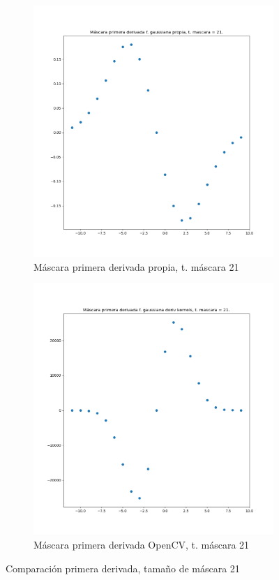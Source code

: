 \documentclass[12pt, spanish]{article}
\begin{document}
\begin{figure}[H]
  \centering
	\begin{subfigure}[t]{0.4\textwidth}
		\centering
		\includegraphics[width = \textwidth]{cmp-p21.png}
 		 \caption{Máscara primera derivada propia, t. máscara 21}
	\end{subfigure}
	\hspace{1cm}
	\begin{subfigure}[t]{0.4\textwidth}
		\centering
		\includegraphics[width = \textwidth]{cmp-cv21.png}
 		 \caption{Máscara primera derivada OpenCV, t. máscara 21}
	\end{subfigure}
	\caption{Comparación primera derivada, tamaño de máscara 21}
  	\label{fig:ej1c5}
\end{figure}
\end{document}
